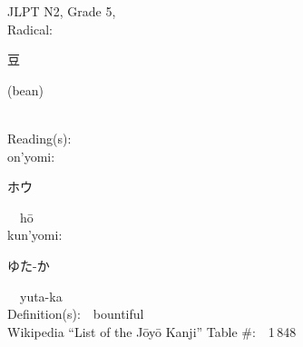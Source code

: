 \begin{multicols}{2}
{JLPT N2, Grade 5, \\Radical:\ \ {\begin{CJK}{UTF8}{min} 豆 \end{CJK}} (bean) } \\
Reading(s):\ \ \\
{\hspace*{1em}}on'yomi:\ \ \\
{\hspace*{2em}}{\begin{CJK}{UTF8}{min} ホウ \end{CJK}}\ \ h\=o\ \ \\
{\hspace*{1em}}kun'yomi:\ \ \\
{\hspace*{2em}}{\begin{CJK}{UTF8}{min} ゆた-か \end{CJK}}\ \ yuta-ka\ \ \\
Definition(s):\ \ bountiful \\
Wikipedia ``List of the J\=oy\=o Kanji'' Table \#:\ \ 1\,848 \\
\ \ \\
\end{multicols}



